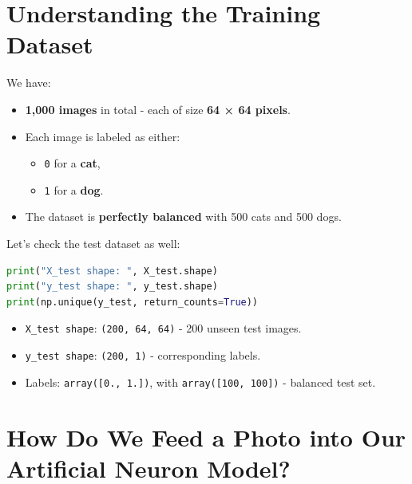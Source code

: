 \documentclass[11pt]{article}
\begin{document}
\vspace{0.5em}

\section*{Understanding the Training Dataset}

\vspace{0.5em}

We have:
\begin{itemize}
    \item \textbf{1,000 images} in total - each of size \textbf{64 × 64 pixels}.
    \item Each image is labeled as either:
        \begin{itemize}
            \item \texttt{0} for a \textbf{cat},
            \item \texttt{1} for a \textbf{dog}.
        \end{itemize}
    \item The dataset is \textbf{perfectly balanced} with 500 cats and 500 dogs.
\end{itemize}

\vspace{1em}

Let's check the test dataset as well:

\begin{lstlisting}[language=Python]
print("X_test shape: ", X_test.shape)
print("y_test shape: ", y_test.shape)
print(np.unique(y_test, return_counts=True))
\end{lstlisting}

\begin{tcolorbox}[colback=gray!5, colframe=black!40, arc=1mm, title=Test Data Overview, fonttitle=\bfseries]
    \begin{itemize}
        \item \texttt{X\_test shape}: \texttt{(200, 64, 64)} - 200 unseen test images.
        \item \texttt{y\_test shape}: \texttt{(200, 1)} - corresponding labels.
        \item Labels: \texttt{array([0., 1.])}, with \texttt{array([100, 100])} - balanced test set.
    \end{itemize}
    \end{tcolorbox}


\section*{How Do We Feed a Photo into Our Artificial Neuron Model?}
\end{document}
